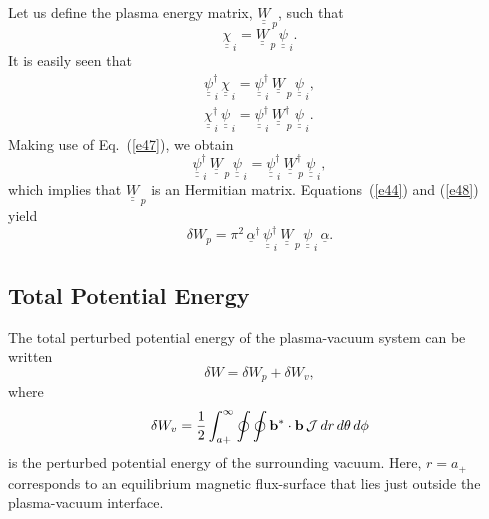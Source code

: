 \documentclass[12pt,prb,aps]{revtex4-1}
\begin{document}
Let us define the plasma energy matrix, $\underline{\underline{W}}_{\,p}$, such that 
\begin{equation}\label{e48}
\underline{\underline{\chi}}_{\,i} = \underline{\underline{W}}_{\,p}\,\underline{\underline{\psi}}_{\,i}.
\end{equation}
 It is easily seen that
 \begin{align}
 \underline{\underline{\psi}}^{\dag}_{\,i}\,\underline{\underline{\chi}}_{\,i}= \underline{\underline{\psi}}^{\dag}_{\,i}\,\underline{\underline{W}}_{\,p}\,
 \underline{\underline{\psi}}_{\,i},\\[0.5ex]
 \underline{\underline{\chi}}^{\dag}_{\,i}\,\underline{\underline{\psi}}_{\,i}= \underline{\underline{\psi}}^{\dag}_{\,i}\,\underline{\underline{W}}_{\,p}^{\dag}\,
 \underline{\underline{\psi}}_{\,i}.
 \end{align}
 Making use of Eq.~(\ref{e47}), we obtain
 \begin{equation}
 \underline{\underline{\psi}}^{\dag}_{\,i}\,\underline{\underline{W}}_{\,p}\,
 \underline{\underline{\psi}}_{\,i}=
 \underline{\underline{\psi}}^{\dag}_{\,i}\,\underline{\underline{W}}_{\,p}^{\dag}\,
 \underline{\underline{\psi}}_{\,i},
 \end{equation}
 which implies that $\underline{\underline{W}}_{\,p}$ is an Hermitian matrix. Equations~(\ref{e44}) and (\ref{e48}) yield
 \begin{equation}\label{e52}
 \delta W_p = \pi^2\,\underline{\alpha}^\dag\,\underline{\underline{\psi}}^{\dag}_{\,i}\,\underline{\underline{W}}_{\,p}\,\underline{\underline{\psi}}_{\,i}\,\underline{\alpha}.
 \end{equation}
 
 \subsection{Total Potential Energy}
The total perturbed potential energy of the plasma-vacuum system can be written\,\cite{freidberg,ideal}
\begin{equation}\label{e79}
\delta W= \delta W_p + \delta W_v,
\end{equation}
where
\begin{equation}
\delta W_v = \frac{1}{2}\int_{a+}^\infty\oint\oint {\bf b}^\ast\cdot{\bf b} \,{\cal J}\,dr\,d\theta\,d\phi
\end{equation}
is the perturbed potential energy of the surrounding vacuum. Here, $r=a_+$ corresponds to an equilibrium magnetic flux-surface that lies just outside the plasma-vacuum interface. 
\end{document}
